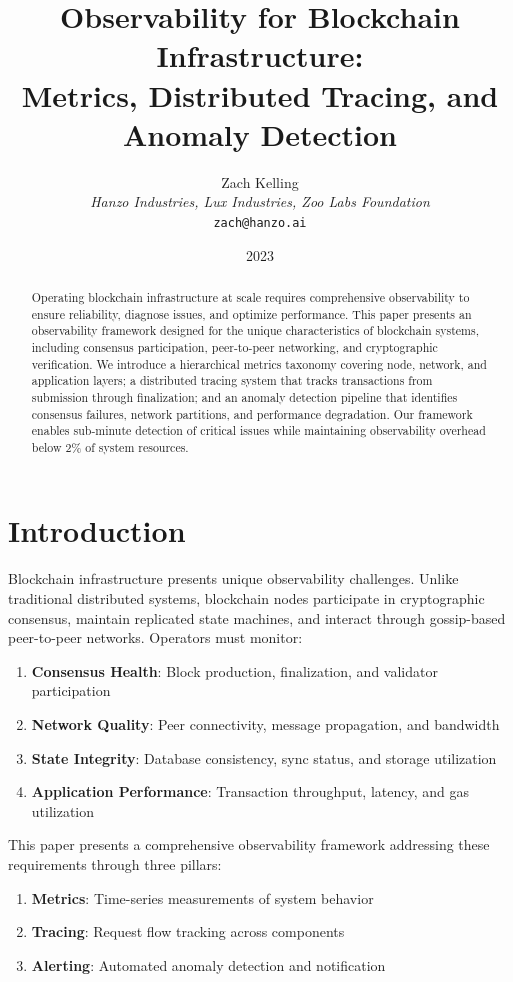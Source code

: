\documentclass[11pt,a4paper]{article}
\title{Observability for Blockchain Infrastructure:\\Metrics, Distributed Tracing, and Anomaly Detection}
\author{Zach Kelling\\
\textit{Hanzo Industries, Lux Industries, Zoo Labs Foundation}\\
\texttt{zach@hanzo.ai}}
\date{2023}
\begin{document}
\maketitle

\begin{abstract}
Operating blockchain infrastructure at scale requires comprehensive observability to ensure reliability, diagnose issues, and optimize performance. This paper presents an observability framework designed for the unique characteristics of blockchain systems, including consensus participation, peer-to-peer networking, and cryptographic verification. We introduce a hierarchical metrics taxonomy covering node, network, and application layers; a distributed tracing system that tracks transactions from submission through finalization; and an anomaly detection pipeline that identifies consensus failures, network partitions, and performance degradation. Our framework enables sub-minute detection of critical issues while maintaining observability overhead below 2\% of system resources.
\end{abstract}

\section{Introduction}

Blockchain infrastructure presents unique observability challenges. Unlike traditional distributed systems, blockchain nodes participate in cryptographic consensus, maintain replicated state machines, and interact through gossip-based peer-to-peer networks. Operators must monitor:

\begin{enumerate}
    \item \textbf{Consensus Health}: Block production, finalization, and validator participation
    \item \textbf{Network Quality}: Peer connectivity, message propagation, and bandwidth
    \item \textbf{State Integrity}: Database consistency, sync status, and storage utilization
    \item \textbf{Application Performance}: Transaction throughput, latency, and gas utilization
\end{enumerate}

This paper presents a comprehensive observability framework addressing these requirements through three pillars:

\begin{enumerate}
    \item \textbf{Metrics}: Time-series measurements of system behavior
    \item \textbf{Tracing}: Request flow tracking across components
    \item \textbf{Alerting}: Automated anomaly detection and notification
\end{enumerate}
\end{document}
